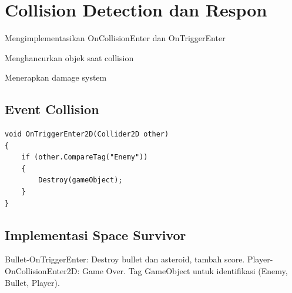 \section{Collision Detection dan Respon}

\begin{learningoutcomes}
\item Mengimplementasikan OnCollisionEnter dan OnTriggerEnter
\item Menghancurkan objek saat collision
\item Menerapkan damage system
\end{learningoutcomes}

\subsection{Event Collision}

\begin{lstlisting}[language={[Sharp]C}]
void OnTriggerEnter2D(Collider2D other)
{
    if (other.CompareTag("Enemy"))
    {
        Destroy(gameObject);
    }
}
\end{lstlisting}

\subsection{Implementasi Space Survivor}

Bullet-OnTriggerEnter: Destroy bullet dan asteroid, tambah score. Player-OnCollisionEnter2D: Game Over. Tag GameObject untuk identifikasi (Enemy, Bullet, Player).
